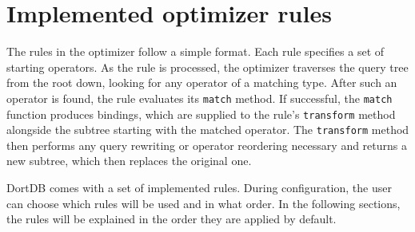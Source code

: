 \section{Implemented optimizer rules}
\label{sec:optimizer}

The rules in the optimizer follow a simple format. Each rule specifies a set of starting operators. As the rule is processed, the optimizer traverses the query tree from the root down, looking for any operator of a matching type. After such an operator is found, the rule evaluates its \texttt{match} method. If successful, the \texttt{match} function produces bindings, which are supplied to the rule's \texttt{transform} method alongside the subtree starting with the matched operator. The \texttt{transform} method then performs any query rewriting or operator reordering necessary and returns a new subtree, which then replaces the original one.

DortDB comes with a set of implemented rules. During configuration, the user can choose which rules will be used and in what order. In the following sections, the rules will be explained in the order they are applied by default.

